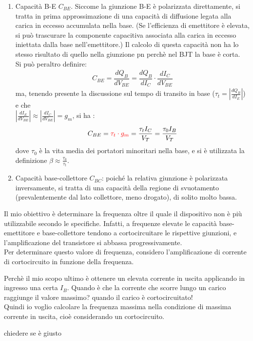 \begin{enumerate}
    \item Capacità B-E $C_{BE}$. Siccome la giunzione B-E è polarizzata direttamente, si tratta in prima approssimazione di una capacità di diffusione legata alla carica in eccesso accumulata nella base. (Se l'efficienza di emettitore è elevata, si può trascurare la componente capacitiva associata alla carica in eccesso iniettata dalla base nell'emettitore.) 
    Il calcolo di questa capacità non ha lo stesso risultato di quello nella giunzione pn perchè nel BJT la base è corta. \\Si può peraltro definire: 
    \begin{align}
        C_{BE} = \dfrac{dQ_B}{dV_{BE}} = \dfrac{dQ_B}{dI_C} \cdot \dfrac{dI_C}{dV_{BE}}
    \end{align}
    ma, tenendo presente la discussione sul tempo di transito in base ($\tau_t=\left|\frac{dQ_B}{dI_E}\right|$) e che \\ $\left|\frac{dI_E}{dV_{BE}}\right| \approx \left|\frac{dI_C}{dV_{BE}}\right| = g_m$, si ha :
    \begin{equation}
    C_{BE}= \textcolor{red}{\tau_t \cdot g_m} =\frac{\tau_t I_C}{V_T}=\frac{\tau_0 I_B}{V_T}
\end{equation}
    dove $\tau_0$ è la vita media dei portatori minoritari nella base, e si è utilizzata la definizione $\beta \approx \frac{\tau_0}{\tau_t}$. 

    \item Capacità base-collettore $C_{BC}$: poiché la relativa giunzione è polarizzata inversamente, si tratta di una capacità della regione di svuotamento (prevalentemente dal lato collettore, meno drogato), di solito molto bassa. 
\end{enumerate}

Il mio obiettivo è determinare la frequenza oltre il quale il dispositivo non è più utilizzabile secondo le specifiche. Infatti, a frequenze elevate le capacità base-emettitore e base-collettore tendono a cortocircuitare le rispettive giunzioni, e l'amplificazione del transistore si abbassa progressivamente. \\
Per determinare questo valore di frequenza, considero l'amplificazione di corrente di cortocircuito in funzione della frequenza.
\begin{exbox}
    Perchè il mio scopo ultimo è ottenere un elevata corrente in uscita applicando in ingresso una certa $I_B$. Quando è che la corrente che scorre lungo un carico raggiunge il valore massimo? quando il carico è cortocircuitato! \\
    Quindi io voglio calcolare la frequenza massima nella condizione di massima corrente in uscita, cioè considerando un cortocircuito.
    \begin{ricevimento}
        chiedere se è giusto
    \end{ricevimento}
    
\end{exbox}
%

